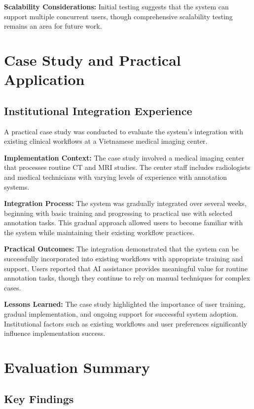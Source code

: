 \textbf{Scalability Considerations:} Initial testing suggests that the system can support multiple concurrent users, though comprehensive scalability testing remains an area for future work.

\section{Case Study and Practical Application}

\subsection{Institutional Integration Experience}

A practical case study was conducted to evaluate the system's integration with existing clinical workflows at a Vietnamese medical imaging center.

\textbf{Implementation Context:} The case study involved a medical imaging center that processes routine CT and MRI studies. The center staff includes radiologists and medical technicians with varying levels of experience with annotation systems.

\textbf{Integration Process:} The system was gradually integrated over several weeks, beginning with basic training and progressing to practical use with selected annotation tasks. This gradual approach allowed users to become familiar with the system while maintaining their existing workflow practices.

\textbf{Practical Outcomes:} The integration demonstrated that the system can be successfully incorporated into existing workflows with appropriate training and support. Users reported that AI assistance provides meaningful value for routine annotation tasks, though they continue to rely on manual techniques for complex cases.

\textbf{Lessons Learned:} The case study highlighted the importance of user training, gradual implementation, and ongoing support for successful system adoption. Institutional factors such as existing workflows and user preferences significantly influence implementation success.

\section{Evaluation Summary}

\subsection{Key Findings}

